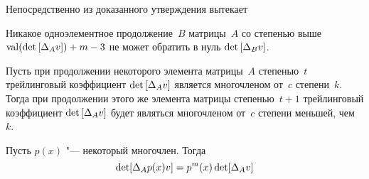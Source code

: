 Непосредственно из доказанного утверждения вытекает
\begin{consequence}
Никакое одноэлементное продолжение~$B$ матрицы~$A$ со степенью выше $\mathop{\rm val}(\mathop{\rm det}\text{$ [\Delta_A v] $})+m-3$ не может обратить в нуль $\mathop{\rm det} \text{$ [\Delta_B v] $}$.
\end{consequence}

\begin{proposition}
Пусть при продолжении некоторого элемента матрицы~$A$ степенью~$t$ трейлинговый коэффициент $\mathop{\rm det} \text{$ [\Delta_A v] $}$ является многочленом от~$c$ степени~$k$.
Тогда при продолжении этого же элемента матрицы степенью~$t + 1$ трейлинговый коэффициент $\mathop{\rm det} \text{$ [\Delta_A v] $}$ будет являться многочленом от~$c$ степени меньшей, чем~$k$.
\end{proposition}

\begin{proposition}
Пусть $p(x)$ "--- некоторый многочлен. Тогда
\begin{equation*}
    \mathop{\rm det}[\Delta_A p(x)v] = p^{m}(x)\mathop{\rm det}[\Delta_A v]
\end{equation*}
\end{proposition}

